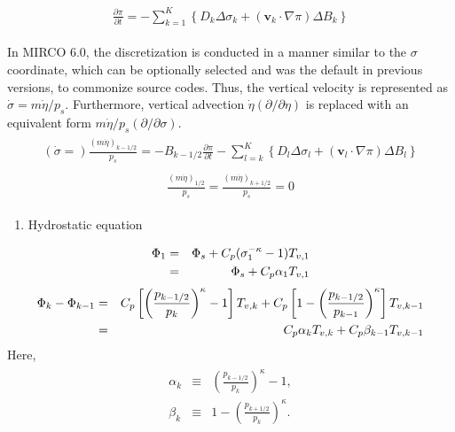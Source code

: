 \begin{eqnarray}\begin{aligned}
  \frac{\partial \pi}{\partial t}
 = - \sum_{k=1}^{K} \left\{ D_k \Delta\sigma_k + ({\mathbf{v}}_k \cdot \nabla \pi)\Delta B_k \right\}\end{aligned}\end{eqnarray}

In MIRCO 6.0, the discretization is conducted in a manner similar to the \(\sigma\) coordinate, which can be optionally selected and was the default in previous versions, to commonize source codes.
Thus, the vertical velocity is represented as \(\dot{\sigma}=m\dot{\eta}/p_s\). Furthermore, vertical advection \(\dot{\eta}(\partial/\partial\eta)\) is replaced with an equivalent form
\(m\dot{\eta}/p_s(\partial/\partial\sigma)\). \begin{eqnarray}\begin{aligned}
  \left(\dot{\sigma}=\right)\frac{(m\dot{\eta})_{k-1/2}}{p_s}
 = - B_{k-1/2} \frac{\partial \pi}{\partial t}
   - \sum_{l=k}^{K}\left\{ D_l \Delta\sigma_l + ({\mathbf{v}}_l \cdot \nabla \pi)\Delta B_l \right\}\end{aligned}\end{eqnarray} \begin{eqnarray}\begin{aligned}
  \frac{(m\dot{\eta})_{1/2}}{p_s} = \frac{(m\dot{\eta})_{k+1/2}}{p_s} = 0\end{aligned}\end{eqnarray}

\begin{enumerate}
\def\labelenumi{\arabic{enumi}.}
\tightlist
\item
  Hydrostatic equation
\end{enumerate}

\begin{eqnarray}\begin{aligned}
 \Phi_{1}  &=&  \Phi_{s} + C_{p} ( \sigma_{1}^{-\kappa} - 1  ) T_{v,1} \notag\\
           &=&  \Phi_{s} + C_{p} \alpha_{1} T_{v,1}\end{aligned}\end{eqnarray} \begin{eqnarray}\begin{aligned}
 \Phi_k - \Phi_{k-1}
  &=&  C_{p}
   \left[ \left( \frac{ p_{k-1/2} }{ p_k } \right)^{\kappa}
          - 1 \right] T_{v,k}
       + C_{p}
   \left[ 1-
         \left( \frac{ p_{k-1/2} }{ p_{k-1} } \right)^{\kappa}
              \right] T_{v,k-1} \notag\\
   &=&    C_{p} \alpha_k T_{v,k} + C_{p} \beta_{k-1} T_{v,k-1}\end{aligned}\end{eqnarray} Here, \begin{eqnarray}\begin{aligned}
 \alpha_k &\equiv & \left( \frac{ p_{k-1/2} }
                               { p_k } \right)^{\kappa} -1, \\
 \beta_k &\equiv &  1- \left( \frac{ p_{k+1/2} }
                               { p_k } \right)^{\kappa} .\end{aligned}\end{eqnarray}

